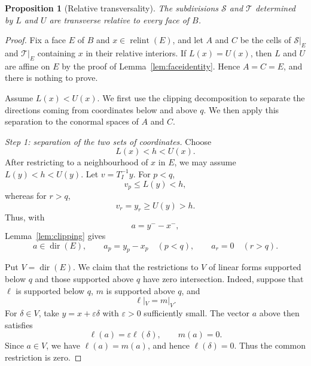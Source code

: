 \documentclass[a4paper,12pt]{amsart}
\newtheorem{proposition}[theorem]{Proposition}
\theoremstyle{definition}
\theoremstyle{remark}
\newcommand{\relint}{\operatorname{relint}}
\newcommand{\dir}{\operatorname{dir}}
\begin{document}
\begin{proposition}[Relative transversality]\label{prop:transversality}
The subdivisions $\mathcal S$ and $\mathcal T$ determined by $L$ and $U$ are transverse relative to every face of $B$.
\end{proposition}

\begin{proof}
Fix a face $E$ of $B$ and $x\in\relint(E)$, and let $A$ and $C$ be the cells of $\mathcal S|_E$ and $\mathcal T|_E$ containing $x$ in their relative interiors. 
If $L(x)=U(x)$, then $L$ and $U$ are affine on $E$ by the proof of Lemma~\ref{lem:faceidentity}. 
Hence $A=C=E$, and there is nothing to prove.

Assume $L(x)<U(x)$. 
We first use the clipping decomposition to separate the directions coming from coordinates below and above $q$. 
We then apply this separation to the conormal spaces of $A$ and $C$.

\smallskip
\noindent\emph{Step 1: separation of the two sets of coordinates.}
Choose
\[
 L(x)<h<U(x).
\]
After restricting to a neighbourhood of $x$ in $E$, we may assume $L(y)<h<U(y)$. 
Let $v=T_I^{-1}y$. 
For $p<q$, 
\[
 v_p\leq L(y)<h,
\]
whereas for $r>q$,
\[
 v_r=y_r\geq U(y)>h.
\]
Thus, with
\[
 a=y^- -x^-,
\]
Lemma~\ref{lem:clipping} gives
\[
 a\in\dir(E),\qquad  a_p=y_p-x_p\quad(p<q),\qquad  a_r=0\quad(r>q).
\]

Put $V=\dir(E)$. 
We claim that the restrictions to $V$ of linear forms supported below $q$ and those supported above $q$ have zero intersection. 
Indeed, suppose that $\ell$ is supported below $q$, $m$ is supported above $q$, and
\[
 \ell|_V=m|_V.
\]
For $\delta\in V$, take $y=x+\varepsilon\delta$ with $\varepsilon>0$ sufficiently small. 
The vector $a$ above then satisfies
\[
 \ell(a)=\varepsilon\ell(\delta),  \qquad
 m(a)=0.
\]
Since $a\in V$, we have $\ell(a)=m(a)$, and hence $\ell(\delta)=0$. 
Thus the common restriction is zero.


\end{proof}
\end{document}
